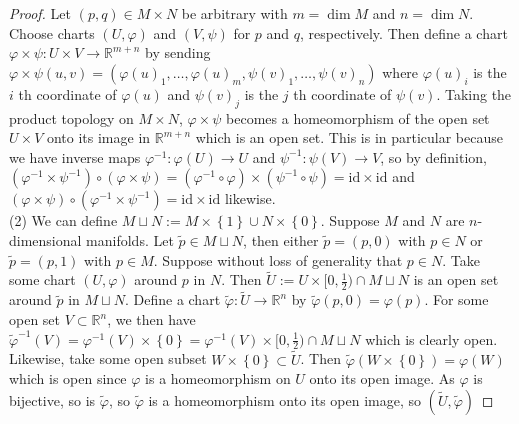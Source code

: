 \documentclass[reqno]{amsart}
\theoremstyle{definition}
\theoremstyle{remark}
\newcommand{\id}{{\mathrm{id}}}
\begin{document}
\begin{proof}
    Let $\left( p,q \right) \in 
    M \times N$ be arbitrary with
    $m = \dim M$ and
     $n = \dim N$. Choose
    charts $\left( U,\varphi  \right) $ and
    $\left( V, \psi  \right) $ for
    $p$ and $q$, respectively.
    Then define a chart
    $\varphi  \times \psi \colon
    U \times V \to \mathbb{R}^{m+n}$ by sending
    $\varphi \times \psi \left( u,v \right) 
    = \left( \varphi (u)_1, \ldots,
    \varphi (u)_m, \psi (v)_1, \ldots,
\psi (v)_n \right) $ where
$\varphi (u)_i$ is the $i$ th coordinate of
$\varphi (u)$ and
$\psi (v)_j$ is the $j$ th coordinate of
$\psi (v)$. Taking the
product topology on $M \times N$, 
$\varphi \times \psi $ becomes a homeomorphism 
of the open set
$U \times V$ onto its image in $\mathbb{R}^{m+n}$ which
is an open set. This is
in particular because we have
inverse maps $\varphi^{-1} \colon
\varphi (U) \to U$ and
$\psi^{-1} \colon \psi (V) \to V$, so by
definition,
$\left( \varphi^{-1} \times \psi^{-1} \right) 
\circ \left( \varphi  \times \psi  \right) 
= \left( \varphi^{-1} \circ \varphi  \right) \times 
\left( \psi^{-1} \circ \psi  \right) 
= \id \times \id$ and
$\left( \varphi \times \psi  \right) 
\circ \left( \varphi^{-1} \times \psi^{-1} \right) 
= \id \times  \id$ likewise.\\
\linebreak
(2) We can define
$M \sqcup N := M \times \left\{ 1 \right\} \cup 
N \times \left\{ 0 \right\} $.
Suppose $M$ and $N$ are $n$-dimensional manifolds. Let
$\tilde{p} \in M \sqcup N$, then either
$\tilde{p} = 
\left( p,0 \right) $ with
$p \in N$ or $\tilde{p}= \left( p,1 \right)$ with
$p \in M$. Suppose without loss of generality that
$p \in N$. Take some chart $\left( U, \varphi  \right) $ 
around $p$ in $N$. Then
$\tilde{U} :=U \times [0,\frac{1}{2}) \cap
M \sqcup N$ is an open set around
$\tilde{p}$ in $M \sqcup N$.
Define a chart $\tilde{\varphi}\colon
\tilde{U} \to \mathbb{R}^{n}$ by
$\tilde{\varphi }\left( p,0 \right) 
= \varphi (p)$.
For some open set $V \subset \mathbb{R}^{n}$, we then
have
$\tilde{\varphi}^{-1}(V) =
\varphi^{-1}(V) \times \left\{ 0 \right\} 
= \varphi ^{-1}(V) \times [0, \frac{1}{2}) \cap
M \sqcup N$ which is clearly open.
Likewise, take some open subset
$W \times \left\{ 0 \right\}  \subset \tilde{U}$. Then
$\tilde{\varphi }\left( W \times \left\{ 0 \right\}  \right) 
= \varphi (W)$ which is open since
$\varphi $ is a homeomorphism on
$U$ onto its open image. As
$\varphi $ is bijective, so is
$\tilde{\varphi }$, so
$\tilde{\varphi }$ is a homeomorphism onto its
open image, so $\left( \tilde{U},\tilde{\varphi } \right) $ 

\end{proof}
\end{document}
